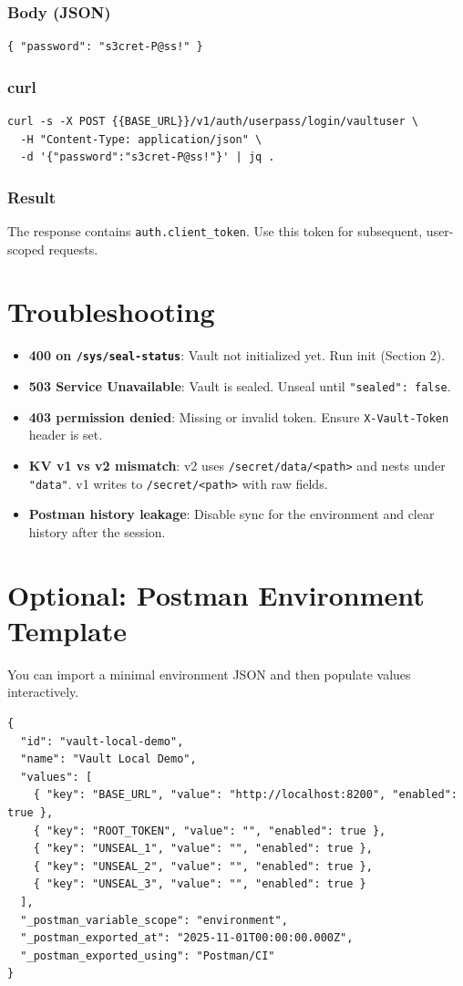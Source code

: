 \documentclass[11pt]{article}
\begin{document}
\subsubsection*{Body (JSON)}
\begin{verbatim}
{ "password": "s3cret-P@ss!" }
\end{verbatim}

\subsubsection*{curl}
\begin{verbatim}
curl -s -X POST {{BASE_URL}}/v1/auth/userpass/login/vaultuser \
  -H "Content-Type: application/json" \
  -d '{"password":"s3cret-P@ss!"}' | jq .
\end{verbatim}

\subsubsection*{Result}
The response contains \texttt{auth.client\_token}. Use this token for subsequent, user-scoped requests.

\section{Troubleshooting}
\begin{itemize}
  \item \textbf{400 on \texttt{/sys/seal-status}}: Vault not initialized yet. Run init (Section 2).
  \item \textbf{503 Service Unavailable}: Vault is sealed. Unseal until \texttt{"sealed": false}.
  \item \textbf{403 permission denied}: Missing or invalid token. Ensure \texttt{X-Vault-Token} header is set.
  \item \textbf{KV v1 vs v2 mismatch}: v2 uses \texttt{/secret/data/<path>} and nests under \texttt{"data"}. v1 writes to \texttt{/secret/<path>} with raw fields.
  \item \textbf{Postman history leakage}: Disable sync for the environment and clear history after the session.
\end{itemize}

\section{Optional: Postman Environment Template}
You can import a minimal environment JSON and then populate values interactively.
\begin{verbatim}
{
  "id": "vault-local-demo",
  "name": "Vault Local Demo",
  "values": [
    { "key": "BASE_URL", "value": "http://localhost:8200", "enabled": true },
    { "key": "ROOT_TOKEN", "value": "", "enabled": true },
    { "key": "UNSEAL_1", "value": "", "enabled": true },
    { "key": "UNSEAL_2", "value": "", "enabled": true },
    { "key": "UNSEAL_3", "value": "", "enabled": true }
  ],
  "_postman_variable_scope": "environment",
  "_postman_exported_at": "2025-11-01T00:00:00.000Z",
  "_postman_exported_using": "Postman/CI"
}
\end{verbatim}
\clearpage
\end{document}
